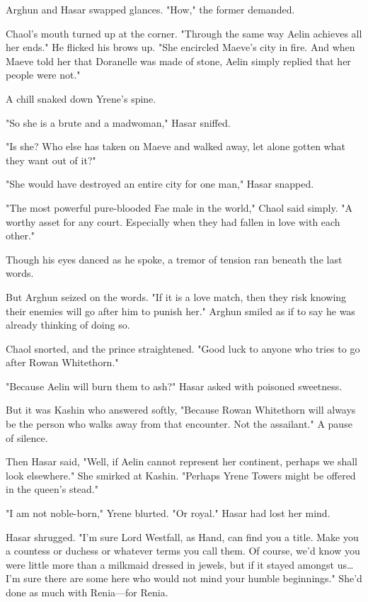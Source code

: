 Arghun and Hasar swapped glances.
"How," the former demanded.

Chaol's mouth turned up at the corner.
"Through the same way Aelin achieves all her ends."
He flicked his brows up.
"She encircled Maeve's city in fire.
And when Maeve told her that Doranelle was made of stone, Aelin simply replied that her people were not."

A chill snaked down Yrene's spine.

"So she is a brute and a madwoman," Hasar sniffed.

"Is she?
Who else has taken on Maeve and walked away, let alone gotten what they want out of it?"

"She would have destroyed an entire city for one man," Hasar snapped.

"The most powerful pure-blooded Fae male in the world," Chaol said simply.
"A worthy asset for any court.
Especially when they had fallen in love with each other."

Though his eyes danced as he spoke, a tremor of tension ran beneath the last words.

But Arghun seized on the words.
"If it is a love match, then they risk knowing their enemies will go after him to punish her."
Arghun smiled as if to say he was already thinking of doing so.

Chaol snorted, and the prince straightened.
"Good luck to anyone who tries to go after Rowan Whitethorn."

"Because Aelin will burn them to ash?"
Hasar asked with poisoned sweetness.

But it was Kashin who answered softly, "Because Rowan Whitethorn will always be the person who walks away from that encounter.
Not the assailant."
A pause of silence.

Then Hasar said, "Well, if Aelin cannot represent her continent, perhaps we shall look elsewhere."
She smirked at Kashin.
"Perhaps Yrene Towers might be offered in the queen's stead."

"I am not noble-born," Yrene blurted.
"Or royal."
Hasar had lost her mind.

Hasar shrugged.
"I'm sure Lord Westfall, as Hand, can find you a title.
Make you a countess or duchess or whatever terms you call them.
Of course, we'd know you were little more than a milkmaid dressed in jewels, but if it stayed amongst us\ldots I'm sure there are some here who would not mind your humble beginnings."
She'd done as much with Renia---for Renia.

